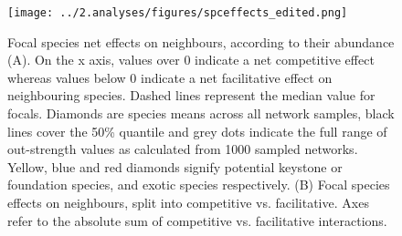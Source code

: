 \documentclass[a4,12pt]{article}
\begin{document}







    \begin{figure}[H]
        \hspace*{-1cm}
        \texttt{[image: ../2.analyses/figures/spceffects\_edited.png]}
        \caption{Focal species net effects on neighbours, according to their abundance (A). On the x axis, values over 0 indicate a net competitive effect whereas values below 0 indicate a net facilitative effect on neighbouring species. Dashed lines represent the median value for focals. Diamonds are species means across all network samples, black lines cover the 50\% quantile and grey dots indicate the full range of out-strength values as calculated from 1000 sampled networks. Yellow, blue and red diamonds signify potential keystone or foundation species, and exotic species respectively. (B) Focal species effects on neighbours, split into competitive vs. facilitative. Axes refer to the absolute sum of competitive vs. facilitative interactions.}
        \label{fig:species}
    \end{figure} 

   





\end{document}
